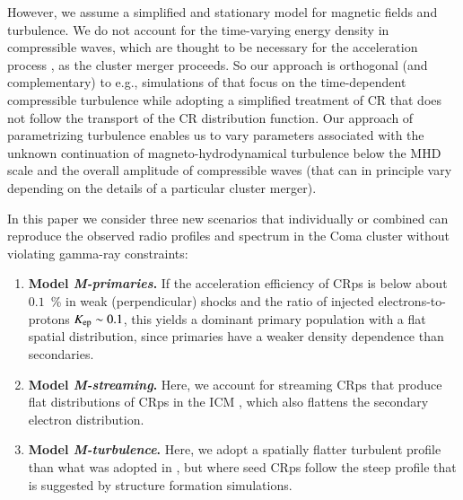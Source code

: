 \documentclass[fleqn,usenatbib,useAMS]{mnras}
\begin{document}
However, we assume a simplified and stationary model for magnetic
fields and turbulence. We do not account for the time-varying energy
density in compressible waves, which are thought to be necessary for
the acceleration process \citep{brunetti07,brunetti11}, as the cluster
merger proceeds.  So our approach is orthogonal (and complementary) to
e.g., simulations of \citealp{2015ApJ...800...60M} that focus on the
time-dependent compressible turbulence while adopting a simplified
treatment of CR that does not follow the transport of the CR
distribution function. Our approach of parametrizing turbulence
enables us to vary parameters associated with the unknown continuation
of magneto-hydrodynamical turbulence below the MHD scale and the
overall amplitude of compressible waves (that can in principle vary
depending on the details of a particular cluster merger).

In this paper we consider three new scenarios that
individually or combined can reproduce the observed radio profiles and
spectrum in the Coma cluster without violating gamma-ray constraints:
\begin{enumerate}
\item {\bf Model {\em M-primaries}.} If the acceleration efficiency of CRps is below
  about $0.1$~{\%} in weak (perpendicular) shocks and the ratio of injected
  electrons-to-protons $K_{{\mathrm{ep}}} \sim 0.1$, this yields a dominant primary
  population with a flat spatial distribution, since primaries have a weaker
  density dependence than secondaries.
\item {\bf Model {\em M-streaming}.} Here, we account for streaming CRps that
  produce flat distributions of CRps in the ICM
  \citep{ensslin11,wiener13,2014MNRAS.438..124Z}, which also flattens the
  secondary electron distribution.
\item {\bf Model {\em M-turbulence}.} Here, we adopt a spatially
  flatter turbulent profile than what was adopted in \citet{brunetti12},
  but where seed CRps follow the steep profile that is suggested by
  structure formation simulations.
\end{enumerate}
\end{document}
